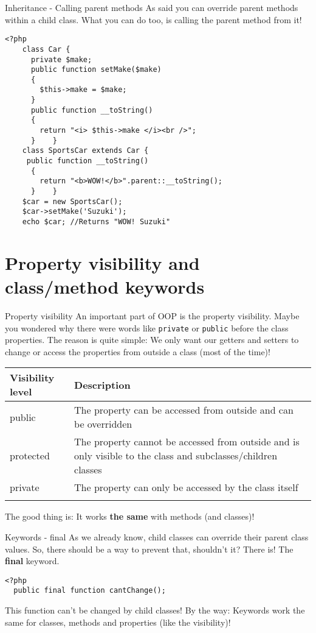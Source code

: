 \begin{frame}[fragile]{Inheritance - Calling parent methods}
	As said you can override parent methods within a child class. What you can do too, is calling the parent method from it!
	\begin{lstlisting}
<?php
    class Car {
      private $make;
      public function setMake($make)
      {
        $this->make = $make;
      }
      public function __toString()
      {
        return "<i> $this->make </i><br />";
      }    }
    class SportsCar extends Car {
     public function __toString()
      {
        return "<b>WOW!</b>".parent::__toString();
      }    }
    $car = new SportsCar();
    $car->setMake('Suzuki');
  	echo $car; //Returns "WOW! Suzuki"
	\end{lstlisting}
\end{frame}

\section{Property visibility and class/method keywords}

\begin{frame}[fragile]{Property visibility}
	An important part of OOP is the property visibility. Maybe you wondered why there were words like \texttt{private} or \texttt{public} before the class properties. \pause The reason is quite simple: We only want our getters and setters to change or access the properties from outside a class (most of the time)!\pause
	\begin{center}
		\begin{tabular}{m{2.5cm} | m{5cm}}
			Visibility level & Description \\
			\hline \pause	
			public & The property can be accessed from outside and can be overridden 	\\
			\hline \pause	
			protected & The property cannot be accessed from outside and is only visible to the class and subclasses/children classes
			\\
			\hline \pause	
			private & The property can only be accessed by the class itself
			\\
			\hline \pause	
		\end{tabular}
	\end{center}
	The good thing is: It works \textbf{the same} with methods (and classes)!\pause
\end{frame}

\begin{frame}[fragile]{Keywords - final}
	As we already know, child classes can override their parent class values. So, there should be a way to prevent that, shouldn't it? \pause
	There is! The \textbf{final} keyword.
	\begin{lstlisting}
<?php
  public final function cantChange();
    \end{lstlisting}
    \pause
    This function can't be changed by child classes!
    By the way: Keywords work the same for classes, methods and properties (like the visibility)!
\end{frame}

